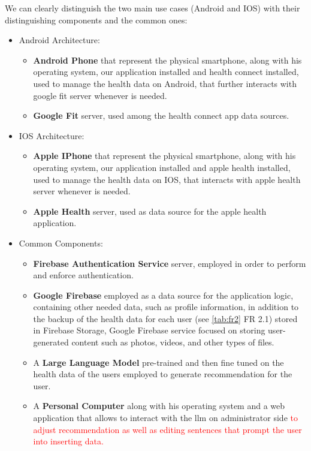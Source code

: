 \noindent We can clearly distinguish the two main use cases (Android and IOS) with their distinguishing components and the common ones:
\vspace{3ex}
\begin{itemize}[nosep] %
    \item Android Architecture:
          \begin{itemize}[nosep]
              \item \textbf{Android Phone} that represent the physical smartphone, along with his operating system, our application installed and health connect installed, used to manage the health data on Android, that further interacts with google fit server whenever is needed.
              \item \textbf{Google Fit} server, used among the health connect app data sources.
          \end{itemize}
    \item IOS Architecture:
          \begin{itemize}[nosep]
              \item \textbf{Apple IPhone} that represent the physical smartphone, along with his operating system, our application installed and apple health installed, used to manage the health data on IOS, that interacts with apple health server whenever is needed.
              \item \textbf{Apple Health} server, used as data source for the apple health application.
          \end{itemize}
          \vspace{17ex}
    \item Common Components:
          \begin{itemize}[nosep]
              \item \textbf{Firebase Authentication Service} server, employed in order to perform and enforce authentication.
              \item \textbf{Google Firebase} employed as a data source for the application logic, containing other needed data, such as profile information, in addition to the backup of the health data for each user (see \cref{tab:fr2} FR 2.1) stored in Firebase Storage, Google Firebase service focused on storing user-generated content such as photos, videos, and other types of files.
              \item A \textbf{Large Language Model} pre-trained and then fine tuned on the health data of the users employed to generate recommendation for the user. 
              \item A \textbf{Personal Computer} along with his operating system and a web application that allows to interact with the llm on administrator side \textcolor{red}{to adjust recommendation as well as editing sentences that prompt the user into inserting data.}  
          \end{itemize}
\end{itemize}

